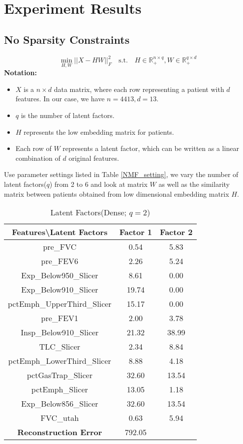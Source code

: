 \documentclass[11pt]{article}
\begin{document}
\section{Experiment Results}
\subsection{No Sparsity Constraints}
\begin{equation}
	\underset{H,W}\min||X-HW||_F^2\quad \text{s.t.}\quad H\in\mathbb{R}_+^{n\times q},W\in\mathbb{R}_+^{q\times d}
\end{equation}
\textbf{Notation:}\\
\begin{itemize}
	\item{$X$ is a $n\times d$ data matrix, where each row representing a patient with $d$ features. In our case, we have $n=4413,d=13$.}
	\item{$q$ is the number of latent factors.}
	\item{$H$ represents the low embedding matrix for patients.}
	\item{Each row of $W$ represents a latent factor, which can be written as a linear combination of $d $ original features.}
\end{itemize}

Use parameter settings listed in Table \ref{NMF_setting}, we vary the number of latent factors($q$) from 2 to 6 and look at matrix $W$ as well as the similarity matrix between patients obtained from low dimensional embedding matrix $H$.\\

\begin{table}[ht]
\caption{Latent Factors(Dense; $q=2$)}
\centering
\begin{tabular}{c | c  c}
\hline\hline
Features\textbackslash Latent Factors & Factor 1 & Factor 2\\[1ex]
\hline
pre\_FVC  &  0.54  &  5.83 \\
pre\_FEV6  &  2.26  &  5.24 \\
Exp\_Below950\_Slicer  &  8.61  &  0.00 \\
Exp\_Below910\_Slicer  &  19.74  &  0.00 \\
pctEmph\_UpperThird\_Slicer  &  15.17  &  0.00 \\
pre\_FEV1  &  2.00  &  3.78 \\
Insp\_Below910\_Slicer  &  21.32  &  38.99 \\
TLC\_Slicer  &  2.34  &  8.84 \\
pctEmph\_LowerThird\_Slicer  &  8.88  &  4.18 \\
pctGasTrap\_Slicer  &  32.60  &  13.54 \\
pctEmph\_Slicer  &  13.05  &  1.18 \\
Exp\_Below856\_Slicer  &  32.60  &  13.54 \\
FVC\_utah  &  0.63  &  5.94 \\
\hline
\textbf{Reconstruction Error} & 792.05\\
\hline
\end{tabular}
\end{table}
\end{document}
